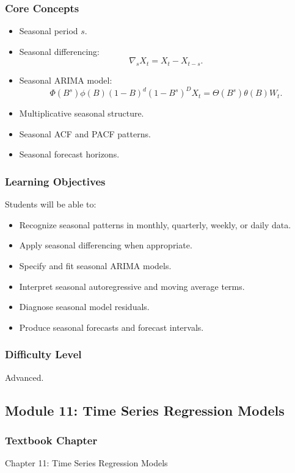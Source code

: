 \documentclass[11pt]{article}
\begin{document}
\subsubsection*{Core Concepts}
\begin{itemize}
    \item Seasonal period $s$.
    \item Seasonal differencing:
    \[
        \nabla_sX_t = X_t - X_{t-s}.
    \]
    \item Seasonal ARIMA model:
    \[
        \Phi(B^s)\phi(B)(1-B)^d(1-B^s)^DX_t
        =
        \Theta(B^s)\theta(B)W_t.
    \]
    \item Multiplicative seasonal structure.
    \item Seasonal ACF and PACF patterns.
    \item Seasonal forecast horizons.
\end{itemize}

\subsubsection*{Learning Objectives}
Students will be able to:
\begin{itemize}
    \item Recognize seasonal patterns in monthly, quarterly, weekly, or daily data.
    \item Apply seasonal differencing when appropriate.
    \item Specify and fit seasonal ARIMA models.
    \item Interpret seasonal autoregressive and moving average terms.
    \item Diagnose seasonal model residuals.
    \item Produce seasonal forecasts and forecast intervals.
\end{itemize}

\subsubsection*{Difficulty Level}
Advanced.

\subsection{Module 11: Time Series Regression Models}

\subsubsection*{Textbook Chapter}
Chapter 11: Time Series Regression Models
\end{document}
